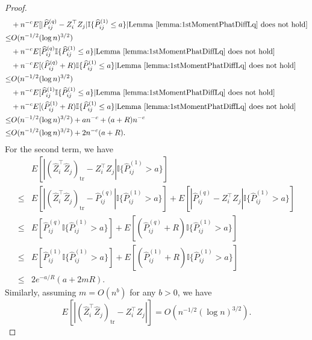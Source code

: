 \begin{proof}
\begin{align*}
	& + n^{-c} E[|\hat{P}^{(q)}_{ij} - Z_i^{\top} Z_j| \mathbb{I}\{\hat{P}^{(1)}_{ij} \le a\} | \mathrm{Lemma\ } \ref{lemma:1stMomentPhatDiffLq} \mathrm{\ does\ not\ hold}] \\
	\le & O(n^{-1/2} (\log n)^{3/2}) \\
	& + n^{-c} E[\hat{P}^{(q)}_{ij} \mathbb{I}\{\hat{P}^{(1)}_{ij} \le a\} | \mathrm{Lemma\ } \ref{lemma:1stMomentPhatDiffLq} \mathrm{\ does\ not\ hold}] \\
	& + n^{-c} E[(\hat{P}^{(q)}_{ij} + R) \mathbb{I}\{\hat{P}^{(1)}_{ij} \le a\} | \mathrm{Lemma\ } \ref{lemma:1stMomentPhatDiffLq} \mathrm{\ does\ not\ hold}] \\
	\le & O(n^{-1/2} (\log n)^{3/2}) \\
	& + n^{-c} E[\hat{P}^{(1)}_{ij} \mathbb{I}\{\hat{P}^{(1)}_{ij} \le a\} | \mathrm{Lemma\ } \ref{lemma:1stMomentPhatDiffLq} \mathrm{\ does\ not\ hold}] \\
	& + n^{-c} E[(\hat{P}^{(1)}_{ij} + R) \mathbb{I}\{\hat{P}^{(1)}_{ij} \le a\} | \mathrm{Lemma\ } \ref{lemma:1stMomentPhatDiffLq} \mathrm{\ does\ not\ hold}] \\
	\le & O(n^{-1/2} (\log n)^{3/2}) + a n^{-c} + (a+R) n^{-c} \\
	\le & O(n^{-1/2} (\log n)^{3/2}) + 2 n^{-c} (a + R).
\end{align*}
For the second term, we have
\begin{align*}
	& E[|(\hat{Z}_i^{\top} \hat{Z}_j)_{\mathrm{tr}} - Z_i^{\top} Z_j| \mathbb{I}\{\hat{P}^{(1)}_{ij} > a\}] \\
	\le & E[|(\hat{Z}_i^{\top} \hat{Z}_j)_{\mathrm{tr}} - \hat{P}^{(q)}_{ij}| \mathbb{I}\{\hat{P}^{(1)}_{ij} > a\}] + E[|\hat{P}^{(q)}_{ij} - Z_i^{\top} Z_j| \mathbb{I}\{\hat{P}^{(1)}_{ij} > a\}] \\
	\le & E[\hat{P}^{(q)}_{ij} \mathbb{I}\{\hat{P}^{(1)}_{ij} > a\}] + E[(\hat{P}^{(q)}_{ij} + R) \mathbb{I}\{\hat{P}^{(1)}_{ij} > a\}] \\
	\le & E[\hat{P}^{(1)}_{ij} \mathbb{I}\{\hat{P}^{(1)}_{ij} > a\}] + E[(\hat{P}^{(1)}_{ij} + R) \mathbb{I}\{\hat{P}^{(1)}_{ij} > a\}] \\
	\le & 2 e^{-a/R} (a + 2 m R).
\end{align*}
Similarly, assuming $m = O(n^b)$ for any $b > 0$, we have
\[
E[|(\hat{Z}_i^{\top} \hat{Z}_j)_{\mathrm{tr}} - Z_i^{\top} Z_j|] = O(n^{-1/2} (\log n)^{3/2}).
\]
\end{proof}

